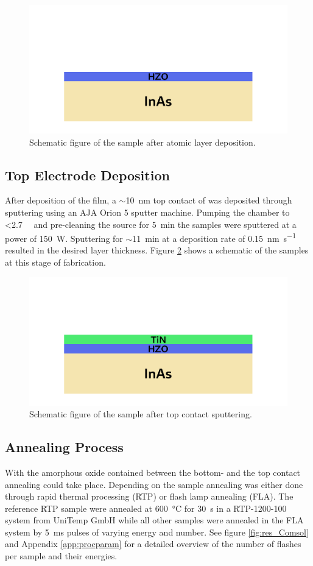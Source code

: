 \documentclass[11pt,twoside]{eitExjobb}
\begin{document}
\begin{figure}[htbp]
    \centering
    \includegraphics[width=.45\linewidth]{fig/fabproc/fab_2.png}
    \caption{Schematic figure of the sample after atomic layer
    deposition.}\label{fig:fab_2}
\end{figure}

\subsection{Top Electrode Deposition}
After deposition of the  film, a $\sim$\SI{10}{\nano\meter} top
contact of  was deposited through sputtering using an AJA Orion 5
sputter machine. Pumping the chamber to <\SI{2.7}{\milli\torr} and pre-cleaning
the source for \SI{5}{\minute} the samples were sputtered at a power of
\SI{150}{\watt}. Sputtering for $\sim$\SI{11}{\minute} at a deposition rate of
\SI{0.15}{\nano\meter\per\second} resulted in the desired layer thickness.
Figure \ref{fig:fab_3} shows a schematic of the samples at this stage of
fabrication.

\begin{figure}[htbp]
    \centering
    \includegraphics[width=.45\linewidth]{fig/fabproc/fab_3.png}
    \caption{Schematic figure of the sample after top contact
    sputtering.}\label{fig:fab_3}
\end{figure}

\subsection{Annealing Process}
With the amorphous oxide contained between the bottom- and the top contact annealing
could take place. Depending on the sample annealing was either done through
rapid thermal processing (RTP) or flash lamp annealing (FLA). The reference RTP
sample were annealed at \SI{600}{\celsius} for \SI{30}{\second} in a
RTP-1200-100 system from UniTemp GmbH while all other samples were annealed in
the FLA system by \SI{5}{\milli\second} pulses of varying energy and number.
See figure \ref{fig:res_Comsol} and Appendix \ref{app:procparam} for a detailed
overview of the number of flashes per sample and their energies.
\end{document}
